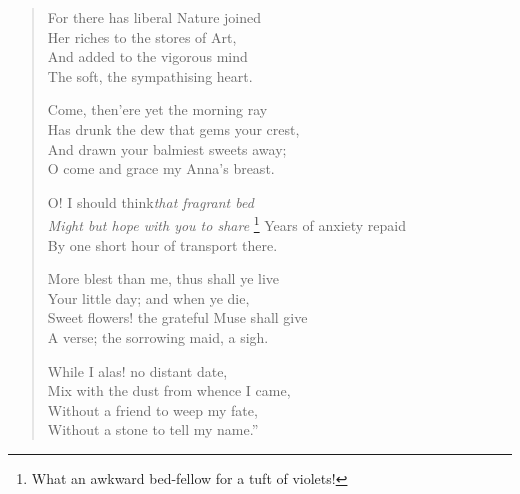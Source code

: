 \begin{verse}
  \begin{altverse}
    For there has liberal Nature joined \\
    Her riches to the stores of Art, \\
    And added to the vigorous mind \\
    The soft, the sympathising heart.
  \end{altverse}

  \begin{altverse}
    Come, then\textemdash 'ere yet the morning ray \\
    Has drunk the dew that gems your crest, \\
    And drawn your balmiest sweets away; \\
    O come and grace my Anna's breast.
  \end{altverse}

  \begin{altverse}
    O! I should think\textemdash \emph{that fragrant
      bed} \\
    \emph{Might but hope with you to share}\textemdash
\footnote{What an awkward bed-fellow for a tuft of violets!}
    Years of anxiety repaid \\
    By one short hour of transport there.
  \end{altverse}

  \begin{altverse}
    More blest than me, thus shall ye live \\
    Your little day; and when ye die, \\
    Sweet flowers! the grateful Muse shall give \\
    A verse; the sorrowing maid, a sigh.
  \end{altverse}

  \begin{altverse}
    While I alas! no distant date, \\
    Mix with the dust from whence I came, \\
    Without a friend to weep my fate, \\
    Without a stone to tell my name.''
  \end{altverse}
\end{verse}

\renewcommand*{\footnoterule}{%
\centering \rule[0.25\baselineskip]{\textwidth}{0.65pt}
}

